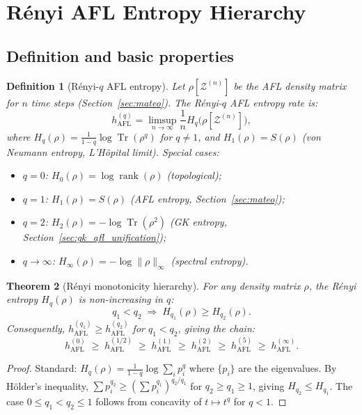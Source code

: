 \documentclass[12pt,a4paper]{article}
\newtheorem{theorem}{Theorem}[section]
\newtheorem{definition}[theorem]{Definition}
\DeclareMathOperator{\Tr}{Tr}
\begin{document}
\section{R\'enyi AFL Entropy Hierarchy}
\label{sec:renyi_hierarchy}

\subsection{Definition and basic properties}

\begin{definition}[R\'enyi-$q$ AFL entropy]
  \label{def:renyi_afl}
  Let $\rho[\mathcal{Z}^{(n)}]$ be the AFL density matrix for $n$ time steps
  (Section~\ref{sec:mateo}).  The \emph{R\'enyi-$q$ AFL entropy rate} is:
  \[
    h_{\mathrm{AFL}}^{(q)}
    = \limsup_{n\to\infty}\frac{1}{n}H_q\!\bigl(\rho[\mathcal{Z}^{(n)}]\bigr),
  \]
  where $H_q(\rho) = \frac{1}{1-q}\log\Tr(\rho^q)$ for $q\neq 1$, and
  $H_1(\rho) = S(\rho)$ (von Neumann entropy, L'H\^opital limit).
  Special cases:
  \begin{itemize}
    \item $q=0$: $H_0(\rho) = \log\operatorname{rank}(\rho)$ \quad (topological);
    \item $q=1$: $H_1(\rho) = S(\rho)$ \quad (AFL entropy, Section~\ref{sec:mateo});
    \item $q=2$: $H_2(\rho) = -\log\Tr(\rho^2)$ \quad (GK entropy, Section~\ref{sec:gk_afl_unification});
    \item $q\to\infty$: $H_\infty(\rho) = -\log\|\rho\|_\infty$ \quad (spectral entropy).
  \end{itemize}
\end{definition}

\begin{theorem}[R\'enyi monotonicity hierarchy]
  \label{thm:renyi_hierarchy}
  For any density matrix $\rho$, the R\'enyi entropy $H_q(\rho)$ is
  non-increasing in $q$:
  \[
    q_1 < q_2
    \;\Longrightarrow\;
    H_{q_1}(\rho) \geq H_{q_2}(\rho).
  \]
  Consequently, $h_{\mathrm{AFL}}^{(q_1)} \geq h_{\mathrm{AFL}}^{(q_2)}$
  for $q_1 < q_2$, giving the chain:
  \begin{equation}
    \label{eq:renyi_chain}
    h_{\mathrm{AFL}}^{(0)}
    \;\geq\; h_{\mathrm{AFL}}^{(1/2)}
    \;\geq\; h_{\mathrm{AFL}}^{(1)}
    \;\geq\; h_{\mathrm{AFL}}^{(2)}
    \;\geq\; h_{\mathrm{AFL}}^{(5)}
    \;\geq\; h_{\mathrm{AFL}}^{(\infty)}.
  \end{equation}
\end{theorem}
\begin{proof}
  Standard: $H_q(\rho) = \frac{1}{1-q}\log\sum_i p_i^q$ where $\{p_i\}$
  are the eigenvalues.  By H\"older's inequality, $\sum p_i^{q_2} \geq
  (\sum p_i^{q_1})^{q_2/q_1}$ for $q_2 \geq q_1 \geq 1$, giving
  $H_{q_2} \leq H_{q_1}$.  The case $0\leq q_1 < q_2 \leq 1$ follows
  from concavity of $t\mapsto t^q$ for $q<1$.
\end{proof}
\end{document}
